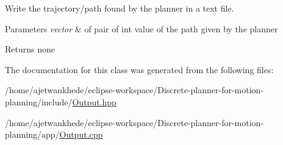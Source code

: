 Write the trajectory/path found by the planner in a text file. 


\begin{DoxyParams}{Parameters}
{\em vector} & of pair of int value of the path given by the planner \\
\hline
\end{DoxyParams}
\begin{DoxyReturn}{Returns}
none 
\end{DoxyReturn}


The documentation for this class was generated from the following files\+:\begin{DoxyCompactItemize}
\item 
/home/ajetwankhede/eclipse-\/workspace/\+Discrete-\/planner-\/for-\/motion-\/planning/include/\mbox{\hyperlink{Output_8hpp}{Output.\+hpp}}\item 
/home/ajetwankhede/eclipse-\/workspace/\+Discrete-\/planner-\/for-\/motion-\/planning/app/\mbox{\hyperlink{Output_8cpp}{Output.\+cpp}}\end{DoxyCompactItemize}
